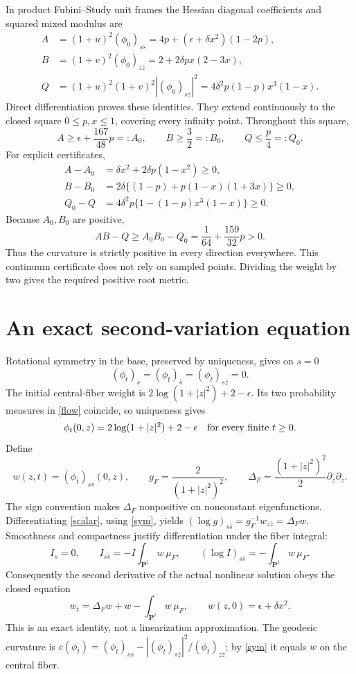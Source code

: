 \documentclass[11pt]{article}
\newcommand{\PP}{\mathbf P}
\begin{document}
In product Fubini--Study unit frames the Hessian diagonal coefficients and
squared mixed modulus are
\begin{align}
 A&=(1+u)^2(\phi_0)_{s\bar s}
     =4p+(\epsilon+\delta x^2)(1-2p),\nonumber\\
 B&=(1+v)^2(\phi_0)_{z\bar z}
     =2+2\delta p x(2-3x),\label{ABC}\\
 Q&=(1+u)^2(1+v)^2|(\phi_0)_{s\bar z}|^2
     =4\delta^2p(1-p)x^3(1-x).\nonumber
\end{align}
Direct differentiation proves these identities. They extend continuously
to the closed square $0\leq p,x\leq1$, covering every infinity point.
Throughout this square,
\[
 A\geq\epsilon+\frac{167}{48}p=:A_0,\qquad
 B\geq\frac32=:B_0,\qquad Q\leq\frac p4=:Q_0.
\]
For explicit certificates,
\begin{align*}
 A-A_0&=\delta x^2+2\delta p(1-x^2)\geq0,\\
 B-B_0&=2\delta\{(1-p)+p(1-x)(1+3x)\}\geq0,\\
 Q_0-Q&=4\delta^2p\{1-(1-p)x^3(1-x)\}\geq0.
\end{align*}
Because $A_0,B_0$ are positive,
\begin{equation}\label{det}
 AB-Q\geq A_0B_0-Q_0=\frac1{64}+\frac{159}{32}p>0.
\end{equation}
Thus the curvature is strictly positive in every direction everywhere.
This continuum certificate does not rely on sampled points.
Dividing the weight by two gives the required positive root metric.

\section{An exact second-variation equation}
Rotational symmetry in the base, preserved by uniqueness, gives on $s=0$
\begin{equation}\label{sym}
 (\phi_t)_s=(\phi_t)_{\bar s}=(\phi_t)_{s\bar z}=0.
\end{equation}
The initial central-fiber weight is
$2\log(1+|z|^2)+2-\epsilon$. Its two probability measures in
\eqref{flow} coincide, so uniqueness gives
\[
 \phi_t(0,z)=2\log(1+|z|^2)+2-\epsilon
 \quad\hbox{for every finite }t\geq0.
\]
Define
\[
 w(z,t)=(\phi_t)_{s\bar s}(0,z),\qquad
 g_F=\frac2{(1+|z|^2)^2},\qquad
 \Delta_F=\frac{(1+|z|^2)^2}{2}\partial_z\partial_{\bar z}.
\]
The sign convention makes $\Delta_F$ nonpositive on nonconstant
eigenfunctions. Differentiating \eqref{scalar}, using \eqref{sym}, yields
$(\log g)_{s\bar s}=g_F^{-1}w_{z\bar z}=\Delta_Fw$.
Smoothness and compactness justify differentiation under the fiber integral:
\[
 I_s=0,\qquad I_{s\bar s}=-I\int_{\PP^1}w\,\mu_F,
 \qquad(\log I)_{s\bar s}=-\int_{\PP^1}w\,\mu_F.
\]
Consequently the second derivative of the actual nonlinear solution obeys
the closed equation
\begin{equation}\label{jet}
 w_t=\Delta_Fw+w-\int_{\PP^1}w\,\mu_F,\qquad
 w(z,0)=\epsilon+\delta x^2.
\end{equation}
This is an exact identity, not a linearization approximation.
The geodesic curvature is
$c(\phi_t)=(\phi_t)_{s\bar s}-|(\phi_t)_{s\bar z}|^2/(\phi_t)_{z\bar z}$;
by \eqref{sym} it equals $w$ on the central fiber.
\end{document}
